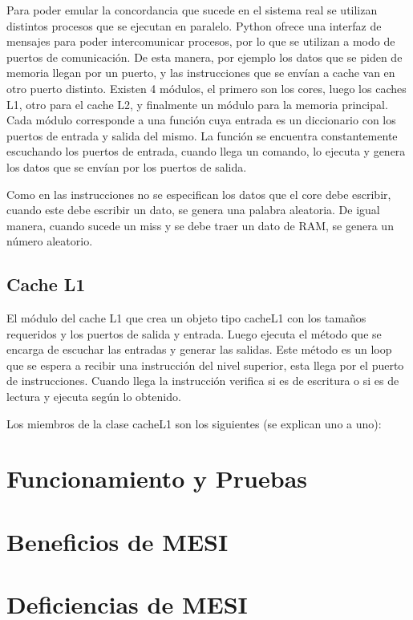 \documentclass {article}
\begin{document}
Para poder emular la concordancia que sucede en el sistema real se utilizan distintos procesos que se
ejecutan en paralelo. Python ofrece una interfaz de mensajes para poder intercomunicar procesos, por
lo que se utilizan a modo de puertos de comunicación. De esta manera, por ejemplo los datos que se
piden de memoria llegan por un puerto, y las instrucciones que se envían a cache van en otro puerto
distinto. Existen 4 módulos, el primero son los cores, luego los caches L1, otro para el cache L2, y
finalmente un módulo para la memoria principal. Cada módulo corresponde a una función cuya entrada
es un diccionario con los puertos de entrada y salida del mismo. La función se encuentra
constantemente escuchando los puertos de entrada, cuando llega un comando, lo ejecuta y genera los
datos que se envían por los puertos de salida. 

Como en las instrucciones no se especifican los datos que el core debe escribir, cuando este debe
escribir un dato, se genera una palabra aleatoria. De igual manera, cuando sucede un miss y se debe
traer un dato de RAM, se genera un número aleatorio.

\subsection{Cache L1}
El módulo del cache L1 que crea un objeto tipo cacheL1 con los tamaños requeridos y los puertos de
salida y entrada. Luego ejecuta el método que se encarga de escuchar las entradas y generar las
salidas. Este método es un loop que se espera a recibir una instrucción del nivel superior, esta
llega por el puerto de instrucciones. Cuando llega la instrucción verifica si es de escritura o si
es de lectura y ejecuta según lo obtenido.

Los miembros de la clase cacheL1 son los siguientes (se explican uno a uno):
\section{Funcionamiento y Pruebas}

\section{Beneficios de MESI}

\section{Deficiencias de MESI}
\end{document}
